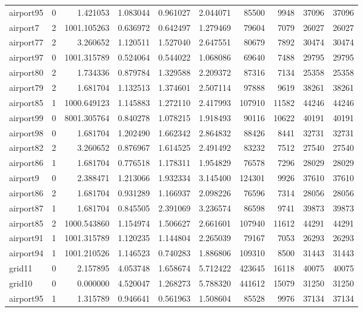 \begin{longtable}{|l|r|r|r|r|r|r|r|r|r|}
airport95 & 0 & 1.421053 & 1.083044 & 0.961027 & 2.044071 & 85500 & 9948 & 37096 & 37096 \\
airport7 & 2 & 1001.105263 & 0.636972 & 0.642497 & 1.279469 & 79604 & 7079 & 26027 & 26027 \\
airport77 & 2 & 3.260652 & 1.120511 & 1.527040 & 2.647551 & 80679 & 7892 & 30474 & 30474 \\
airport97 & 0 & 1001.315789 & 0.524064 & 0.544022 & 1.068086 & 69640 & 7488 & 29795 & 29795 \\
airport80 & 2 & 1.734336 & 0.879784 & 1.329588 & 2.209372 & 87316 & 7134 & 25358 & 25358 \\
airport79 & 2 & 1.681704 & 1.132513 & 1.374601 & 2.507114 & 97888 & 9619 & 38261 & 38261 \\
airport85 & 1 & 1000.649123 & 1.145883 & 1.272110 & 2.417993 & 107910 & 11582 & 44246 & 44246 \\
airport99 & 0 & 8001.305764 & 0.840278 & 1.078215 & 1.918493 & 90116 & 10622 & 40191 & 40191 \\
airport98 & 0 & 1.681704 & 1.202490 & 1.662342 & 2.864832 & 88426 & 8441 & 32731 & 32731 \\
airport82 & 2 & 3.260652 & 0.876967 & 1.614525 & 2.491492 & 83232 & 7512 & 27540 & 27540 \\
airport86 & 1 & 1.681704 & 0.776518 & 1.178311 & 1.954829 & 76578 & 7296 & 28029 & 28029 \\
airport9 & 0 & 2.388471 & 1.213066 & 1.932334 & 3.145400 & 124301 & 9926 & 37610 & 37610 \\
airport86 & 2 & 1.681704 & 0.931289 & 1.166937 & 2.098226 & 76596 & 7314 & 28056 & 28056 \\
airport87 & 1 & 1.681704 & 0.845505 & 2.391069 & 3.236574 & 86598 & 9741 & 39873 & 39873 \\
airport85 & 2 & 1000.543860 & 1.154974 & 1.506627 & 2.661601 & 107940 & 11612 & 44291 & 44291 \\
airport91 & 1 & 1001.315789 & 1.120235 & 1.144804 & 2.265039 & 79167 & 7053 & 26293 & 26293 \\
airport94 & 1 & 1001.210526 & 1.146523 & 0.740283 & 1.886806 & 109310 & 8500 & 31443 & 31443 \\
grid11 & 0 & 2.157895 & 4.053748 & 1.658674 & 5.712422 & 423645 & 16118 & 40075 & 40075 \\
grid10 & 0 & 0.000000 & 4.520047 & 1.268273 & 5.788320 & 441612 & 15079 & 31250 & 31250 \\
airport95 & 1 & 1.315789 & 0.946641 & 0.561963 & 1.508604 & 85528 & 9976 & 37134 & 37134 \\

\end{longtable}
